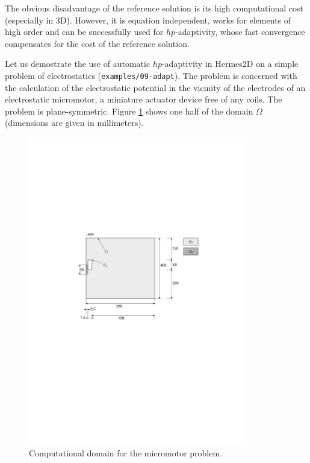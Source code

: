 The obvious disadvantage of the reference solution is its high computational cost (especially
in 3D). However, it is equation independent, works for elements of high order and can be
successfully used for $hp$-adaptivity, whose fast convergence compensates for the cost
of the reference solution.

Let us demostrate the use of automatic $hp$-adaptivity in Hermes2D on a simple problem of 
electrostatics ({\tt examples/09-adapt}). The problem is concerned with the calculation of
the electrostatic potential in the vicinity of the electrodes of an electrostatic micromotor,
a miniature actuator device free of any coils. The problem is plane-symmetric.
Figure \ref{fig:micromotor} shows one half of the domain $\Omega$
(dimensions are given in millimeters).

\begin{figure}[ht]
  \medskip \centering
  \includegraphics[width=0.85\textwidth]{img/micromotor}
  \caption{Computational domain for the micromotor problem.}
  \label{fig:micromotor}
\end{figure}


